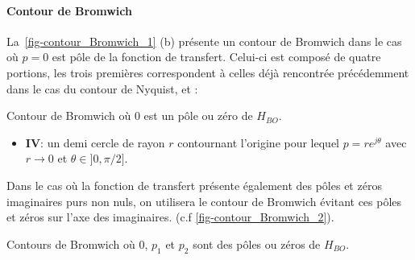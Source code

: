 \paragraph{Contour de Bromwich}
La~\cref{fig-contour_Bromwich_1} (b) présente un contour de Bromwich dans le 
cas où $p=0$ est pôle de la fonction de transfert. Celui-ci est composé de quatre 
portions, les trois premières correspondent à celles déjà rencontrée précédemment
dans le cas du contour de Nyquist, et :
\begin{marginfigure}
    \centering
    
    \caption{Contour de Bromwich où 0 est un pôle ou zéro 
             de $H_{BO}$.\label{fig-contour_Bromwich_1}} 
\end{marginfigure}
\begin{itemize}
    \item \textbf{IV}:  un demi cercle de rayon $r$ contournant l'origine 
          pour lequel $p=re^{j\theta}$ avec $r\rightarrow0$ et 
          $\theta\in]0,\pi/2]$.
\end{itemize}
Dans le cas où la fonction de transfert présente également 
des pôles et zéros imaginaires purs non nuls, on utilisera le contour de Bromwich 
évitant ces pôles et zéros sur l'axe des imaginaires. 
(c.f \cref{fig-contour_Bromwich_2}).
\begin{marginfigure}
    \centering
    
    \caption{Contours de Bromwich où 0, $p_1$ et $p_2$ sont des pôles
             ou zéros de $H_{BO}$.\label{fig-contour_Bromwich_2}} 
\end{marginfigure}
\clearpage
\restoregeometry
\captionsetup{width=0.9\linewidth}
